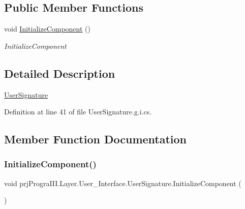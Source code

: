\subsection*{Public Member Functions}
\begin{DoxyCompactItemize}
\item 
void \hyperlink{classprj_progra_i_i_i_1_1_layer_1_1_user___interface_1_1_user_signature_a2a7ae589471f97d87d4dca9bb2915113}{Initialize\+Component} ()
\begin{DoxyCompactList}\small\item\em Initialize\+Component \end{DoxyCompactList}\end{DoxyCompactItemize}


\subsection{Detailed Description}
\hyperlink{classprj_progra_i_i_i_1_1_layer_1_1_user___interface_1_1_user_signature}{User\+Signature} 



Definition at line 41 of file User\+Signature.\+g.\+i.\+cs.



\subsection{Member Function Documentation}
\hypertarget{classprj_progra_i_i_i_1_1_layer_1_1_user___interface_1_1_user_signature_a2a7ae589471f97d87d4dca9bb2915113}{}\label{classprj_progra_i_i_i_1_1_layer_1_1_user___interface_1_1_user_signature_a2a7ae589471f97d87d4dca9bb2915113} 
\subsubsection{\texorpdfstring{Initialize\+Component()}{InitializeComponent()}}
{\footnotesize\ttfamily void prj\+Progra\+I\+I\+I.\+Layer.\+User\+\_\+\+Interface.\+User\+Signature.\+Initialize\+Component (\begin{DoxyParamCaption}{ }\end{DoxyParamCaption})}



